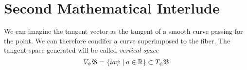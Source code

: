 
\section{Second Mathematical Interlude}


We can imagine the tangent vector as the tangent of a smooth curve passing for the point. We can therefore condifer a curve superimposed to the fiber. The tangent space generated will be called \emph{vertical space}
\begin{equation}
V_{\psi}\mathfrak{B} = \left\{ia\psi\mid a\in\mathbb{R} \right\} \subset T_{\psi}\mathfrak{B}
\end{equation} 
